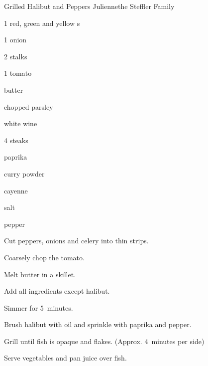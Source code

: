 \begin{recipe}{Grilled Halibut and Peppers Julienne}{the Steffler Family}{}

\begin{ingredients}
\item 1 red, green and yellow s
\item 1 onion
\item 2  stalks
\item 1 tomato
\item {} butter
\item {} chopped parsley
\item \C{\twothird} white wine
\item 4  steaks
\item paprika
\item curry powder
\item cayenne
\item salt
\item pepper
\end{ingredients}

\begin{directions}
\item Cut peppers, onions and celery into thin strips.
\item Coarsely chop the tomato.
\item Melt butter in a skillet.
\item Add all ingredients except halibut.
\item Simmer for 5~minutes.
\item Brush halibut with oil and sprinkle with paprika and pepper.
\item Grill until fish is opaque and flakes. (Approx. 4~minutes per side)
\item Serve vegetables and pan juice over fish.
\end{directions}
\end{recipe}

